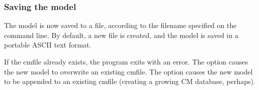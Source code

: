 \subsubsection{Saving the model}

The model is now saved to a file, according to the filename specified
on the command line. By default, a new file is created, and the model
is saved in a portable ASCII text format.

If the cmfile already exists, the program exits with an error. The
 option causes the new model to overwrite an existing
cmfile. The  option causes the new model to be appended to
an existing cmfile (creating a growing CM database, perhaps).


